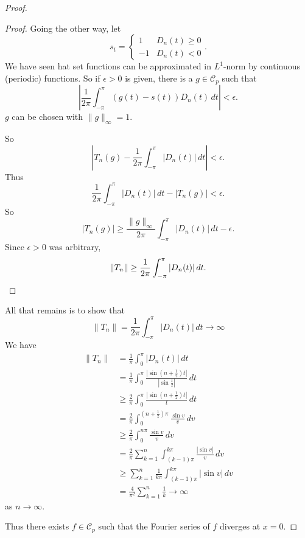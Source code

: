 \documentclass[10pt, oneside, reqno]{amsart}
\theoremstyle{plain}%
\theoremstyle{definition}
\theoremstyle{remark}
\begin{document}
\begin{proof}
\begin{proof}
    Going the other way, let \[
        s_t = \begin{cases}
        1 &D_n(t) \geq 0 \\
        -1 &D_n(t) < 0
        \end{cases}.
    \]  We have seen hat set functions can be approximated in $L^1$-norm by continuous (periodic) functions.  So if $\epsilon > 0$ is given, there is a $g \in \mathcal C_p$ such that \[
        \left| \frac{1}{2\pi} \int_{-\pi}^\pi (g(t) - s(t))D_n(t) \, dt \right| < \epsilon. 
    \] $g$ can be chosen with $\| g \|_\infty = 1$.  
    
      So \[
        \left| T_n(g) - \frac{1}{2\pi} \int_{-\pi}^\pi |D_n(t)| \, dt \right| < \epsilon.
    \]  Thus \[
        \frac{1}{2\pi} \int_{-\pi}^\pi |D_n(t) | \, dt - |T_n(g)| < \epsilon.  
    \]  So \[
        |T_n(g)| \geq \frac{\| g \|_\infty}{2 \pi} \int_{-\pi}^\pi |D_n(t)| \, dt - \epsilon. 
    \]  Since $\epsilon > 0$ was arbitrary, \[
        \|T_n \| \geq \frac{1}{2 \pi} \int_{-\pi}^\pi |D_n(t) | \, dt. \qedhere
    \]
\end{proof}

All that remains is to show that \[
    \|T_n \| = \frac{1}{2\pi} \int_{-\pi}^\pi |D_n(t)| \, dt \rightarrow \infty
\]  We have 
\begin{align*}
    \|T_n \|    &= \frac{1}{\pi}\int_0^\pi |D_n(t) | \, dt \\
                &= \frac{1}{\pi} \int_0^\pi \frac{|\sin(n+\frac{1}{2})t|}{|\sin \frac{t}{2}|} \, dt \\
                &\geq \frac{2}{\pi} \int_0^\pi \frac{|\sin(n+\frac{1}{2}) t |}{t} \, dt \\
                &= \frac{2}{\pi} \int_0^{(n+\frac{1}{2})\pi} \frac{\sin v}{v} \, dv \\
                &\geq \frac{2}{\pi} \int_0^{n\pi} \frac{\sin v}{v} \, dv \\
                &= \frac{2}{\pi} \sum_{k=1}^n \int_{(k-1)\pi}^{k \pi} \frac{|\sin v|}{v} \, dv \\
                &\geq \sum_{k=1}^n \frac{1}{k \pi} \int_{(k-1)\pi}^{k \pi} |\sin v | \, dv \\
                &= \frac{4}{\pi^2} \sum_{k =1 }^n \frac{1}{k} \rightarrow \infty
\end{align*} as $n \rightarrow \infty$.  

Thus there exists $f \in \mathcal C_p$ such that the Fourier series of $f$ diverges at $x = 0$.  
\end{proof}
\end{document}
